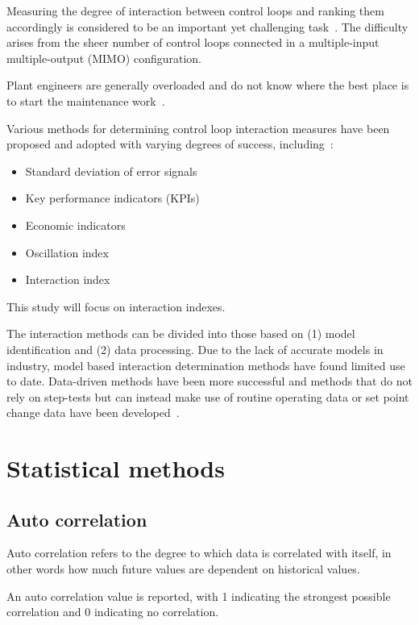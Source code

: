 \documentclass[a4paper]{book}
\begin{document}
Measuring the degree of interaction between control loops and ranking them accordingly is considered to be an important yet challenging task~\cite{Rahman2011}.
The difficulty arises from the sheer number of control loops connected in a multiple-input multiple-output (MIMO) configuration.

Plant engineers are generally overloaded and do not know where the best place is to start the maintenance work~\cite{Rahman2011}.

Various methods for determining control loop interaction measures have been proposed and adopted with varying degrees of success, including~\cite{Rahman2011}: %

\begin{itemize}
  \item Standard deviation of error signals
  \item Key performance indicators (KPIs) 
  \item Economic indicators
  \item Oscillation index
  \item Interaction index
\end{itemize}

This study will focus on interaction indexes. %

The interaction methods can be divided into those based on (1) model identification and (2) data processing.
Due to the lack of accurate models in industry, model based interaction determination methods have found limited use to date.
Data-driven methods have been more successful and methods that do not rely on step-tests but can instead make use of routine operating data or set point change data have been developed~\cite{Rahman2011}. %

\section{Statistical methods}

\subsection{Auto correlation}

Auto correlation refers to the degree to which data is correlated with itself, in other words how much future values are dependent on historical values. %

An auto correlation value is reported, with 1 indicating the strongest possible correlation and 0 indicating no correlation.
\end{document}
